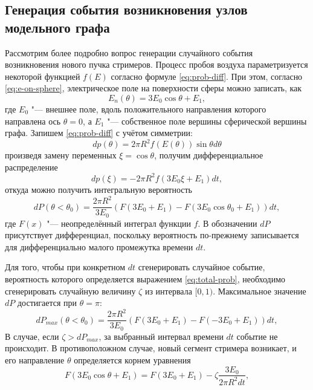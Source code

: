 \subsection{Генерация события возникновения узлов модельного графа}
\label{sec:streamer-generation}
Рассмотрим более подробно вопрос генерации случайного события возникновения нового пучка стримеров. Процесс пробоя воздуха параметризуется некоторой функцией $f(E)$ согласно формуле \eqref{eq:prob-diff}. При этом, согласно \eqref{eq:e-on-sphere}, электрическое поле на поверхности сферы можно записать, как 
\begin{equation}
	E_n(\theta) = 3E_0 \cos \theta + E_1,
\end{equation}
где $E_0$ "--- внешнее поле, вдоль положительного направления которого направлена ось $\theta = 0$, а $E_1$ "--- собственное поле вершины сферической вершины графа. Запишем \eqref{eq:prob-diff} с учётом симметрии:
\begin{equation}
	dp(\theta) = 2\pi R^2 f(E(\theta)) \sin \theta d\theta
\end{equation}
произведя замену переменных $\xi = \cos \theta$, получим дифференциальное распределение
\begin{equation}
	dp(\xi) = -2\pi R^2 f(3E_0 \xi + E_1) dt,
\end{equation}
откуда можно получить интегральную вероятность
\begin{equation}
	dP(\theta<\theta_0) = \frac{2\pi R^2}{3E_0} \left( F(3E_0 + E_1) - F(3E_0 \cos \theta_0 + E_1)\right)dt,
	\label{eq:total-prob}
\end{equation}
где $F(x)$ "--- неопределённый интеграл функции $f$. В обозначении $dP$ присутствует дифференциал, поскольку вероятность по-прежнему записывается для дифференциально малого промежутка времени $dt$.

Для того, чтобы при конкретном $dt$ сгенерировать случайное событие, вероятность которого определяется выражением \eqref{eq:total-prob}, необходимо сгенерировать случайную величину $\zeta$ из интервала $[0, 1)$. Максимальное значение $dP$ достигается при $\theta = \pi$:
\begin{equation}
	dP_{max}(\theta<\theta_0) = \frac{2\pi R^2}{3E_0} \left( F(3E_0 + E_1) - F(-3E_0 + E_1)\right)dt,
	\label{eq:total-prob-max}
\end{equation}
В случае, если $\zeta > dP_{max}$, за выбранный интервал времени $dt$ событие не происходит. В противоположном случае, новый сегмент стримера возникает, и его направление $\theta$ определяется корнем уравнения
\begin{equation}
	F(3E_0 \cos \theta + E_1) =  F(3E_0 + E_1) - \zeta \frac{3E_0}{2\pi R^2 dt},
	\label{eq:theta-equation}
\end{equation}

